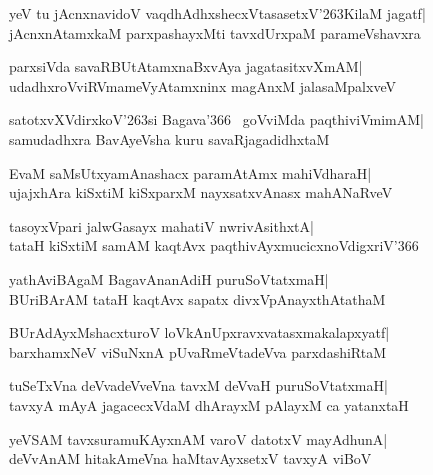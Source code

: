 \documentclass[twoside,12pt,openright]{book}
\def\S{\char'263}
\newcounter{shloka}[chapter]
\begin{document}
\begin{shloka}%
yeV tu jAcnxnavidoV vaqdhAdhxshecxVtasasetxV\S KilaM jagatf|\\
jAcnxnAtamxkaM parxpashayxMti tavxdUrxpaM parameVshavxra
\end{shloka}

\begin{shloka}%
parxsiVda savaRBUtAtamxnaBxvAya jagatasitxvXmAM|\\
udadhxroVviRVmameVyAtamxninx magAnxM jalasaMpalxveV
\end{shloka}

\begin{shloka}%
satotxvXVdirxkoV\S si Bagava\char'366~ goVviMda paqthiviVmimAM|\\
samudadhxra BavAyeVsha kuru savaRjagadidhxtaM
\end{shloka}

\begin{shloka}%
EvaM saMsUtxyamAnashacx paramAtAmx mahiVdharaH|\\
ujajxhAra kiSxtiM kiSxparxM nayxsatxvAnasx mahANaRveV
\end{shloka}

\begin{shloka}%
tasoyxVpari jalwGasayx mahatiV nwrivAsithxtA|\\
tataH kiSxtiM samAM kaqtAvx paqthivAyxmucicxnoVdigxriV\char'366
\end{shloka}

\begin{shloka}%
yathAviBAgaM BagavAnanAdiH puruSoVtatxmaH|\\
BUriBArAM tataH kaqtAvx sapatx divxVpAnayxthAtathaM
\end{shloka}

\begin{shloka}%
BUrAdAyxMshacxturoV loVkAnUpxravxvatasxmakalapxyatf|\\
barxhamxNeV viSuNxnA pUvaRmeVtadeVva parxdashiRtaM
\end{shloka}

\begin{shloka}%
tuSeTxVna deVvadeVveVna tavxM deVvaH puruSoVtatxmaH|\\
tavxyA mAyA jagacecxVdaM dhArayxM pAlayxM ca yatanxtaH
\end{shloka}

\begin{shloka}%
yeVSAM tavxsuramuKAyxnAM varoV datotxV mayAdhunA|\\
deVvAnAM hitakAmeVna haMtavAyxsetxV tavxyA viBoV
\end{shloka}
\end{document}
